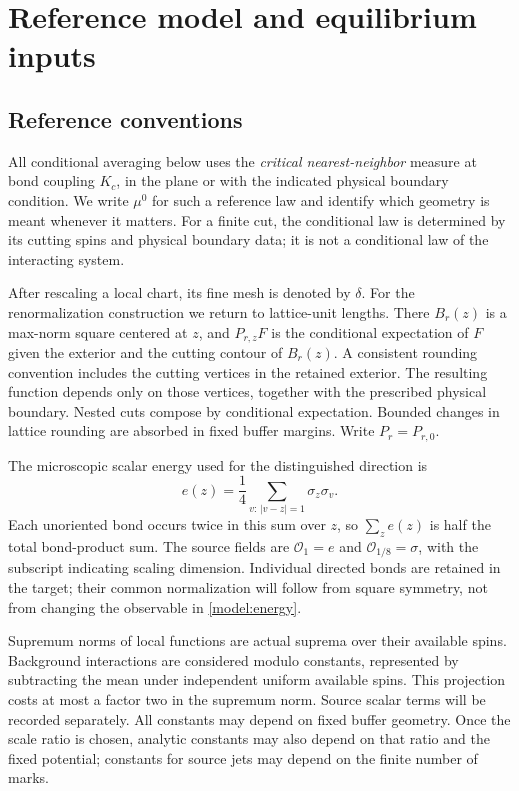 \section{Reference model and equilibrium inputs}\label{sec:inputs}

\subsection{Reference conventions}\label{model:reference}

All conditional averaging below uses the \emph{critical nearest-neighbor}
measure at bond coupling $K_c$, in the plane or with the indicated physical
boundary condition. We write $\mu^0$ for such a reference law and identify
which geometry is meant whenever it matters. For a finite cut, the
conditional law is determined by its cutting spins and physical boundary
data; it is not a conditional law of the interacting system.

After rescaling a local chart, its fine mesh is denoted by $\delta$.
For the renormalization construction we return to lattice-unit lengths.
There $B_r(z)$ is a max-norm square centered at $z$, and $P_{r,z}F$ is
the conditional expectation of $F$ given the exterior and the cutting
contour of $B_r(z)$. A consistent rounding convention includes the cutting
vertices in the retained exterior. The resulting function depends only on
those vertices, together with the prescribed physical boundary. Nested
cuts compose by conditional expectation. Bounded changes in lattice
rounding are absorbed in fixed buffer margins. Write $P_r=P_{r,0}$.

The microscopic scalar energy used for the distinguished direction is
\begin{equation}\label{model:scalar-energy}
 e(z)=\frac14\sum_{v:\,|v-z|=1}\sigma_z\sigma_v.
\end{equation}
Each unoriented bond occurs twice in this sum over $z$, so
$\sum_z e(z)$ is half the total bond-product sum. The source fields are
$\mathcal O_1=e$ and $\mathcal O_{1/8}=\sigma$, with the subscript
indicating scaling dimension. Individual directed bonds are retained in
the target; their common normalization will follow from square symmetry,
not from changing the observable in \eqref{model:energy}.

Supremum norms of local functions are actual suprema over their available
spins. Background interactions are considered modulo constants, represented
by subtracting the mean under independent uniform available spins. This
projection costs at most a factor two in the supremum norm. Source scalar
terms will be recorded separately. All constants may depend on fixed
buffer geometry. Once the scale ratio is chosen, analytic constants may
also depend on that ratio and the fixed potential; constants for source
jets may depend on the finite number of marks.

